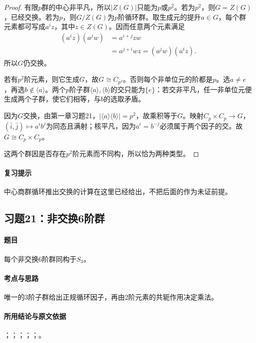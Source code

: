 \begin{proof}
有限$p$群的中心非平凡，所以$|Z(G)|$只能为$p$或$p^2$。若为$p^2$，则$G=Z(G)$，已经交换。若为$p$，则$G/Z(G)$为$p$阶循环群。取生成元的提升$a\in G$，每个群元素都可写成$a^iz$，其中$z\in Z(G)$。因而任意两个元素满足
\begin{align*}
(a^iz)(a^jw)&=a^{i+j}zw\\
&=a^{j+i}wz=(a^jw)(a^iz).
\end{align*}
所以$G$仍交换。

若有$p^2$阶元素，则它生成$G$，故$G\cong C_{p^2}$。否则每个非单位元的阶都是$p$。选$a\ne e$，再选$b\notin\langle a\rangle$。两个$p$阶子群$\langle a\rangle,\langle b\rangle$的交只能为$\{e\}$：若交非平凡，任一非单位元便生成两个子群，使它们相等，与$b$的选取矛盾。

因为$G$交换，由第一章习题21，$|\langle a\rangle\langle b\rangle|=p^2$，故乘积等于$G$。映射$C_p\times C_p\to G$，$(\bar i,\bar j)\mapsto a^ib^j$为同态且满射；核平凡，因为$a^i=b^{-j}$必须属于两个因子的交。故$G\cong C_p\times C_p$。

这两个群因是否存在$p^2$阶元素而不同构，所以恰为两种类型。
\end{proof}

\paragraph{复习提示}
中心商群循环推出交换的计算在这里已经给出，不把后面的作为未证前提。


\subsection{习题21：\texorpdfstring{非交换6阶群}{非交换6阶群}}
\label{ex:2:21}

\paragraph{题目}
每个非交换6阶群同构于$S_3$。

\paragraph{考点与思路}
唯一的3阶子群给出正规循环因子，再由2阶元素的共轭作用决定乘法。

\paragraph{所用结论与原文依据}
；；；；；。

